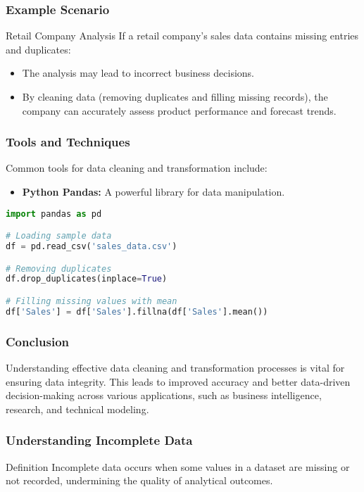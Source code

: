 \documentclass[aspectratio=169]{beamer}
\begin{document}
\begin{frame}[fragile]
    \frametitle{Example Scenario}
    \begin{block}{Retail Company Analysis}
        If a retail company's sales data contains missing entries and duplicates:
        \begin{itemize}
            \item The analysis may lead to incorrect business decisions.
            \item By cleaning data (removing duplicates and filling missing records), the company can accurately assess product performance and forecast trends.
        \end{itemize}
    \end{block}
\end{frame}

\begin{frame}[fragile]
    \frametitle{Tools and Techniques}
    Common tools for data cleaning and transformation include:
    \begin{itemize}
        \item \textbf{Python Pandas:} A powerful library for data manipulation.
    \end{itemize}
    \begin{lstlisting}[language=Python]
import pandas as pd

# Loading sample data
df = pd.read_csv('sales_data.csv')

# Removing duplicates
df.drop_duplicates(inplace=True)

# Filling missing values with mean
df['Sales'] = df['Sales'].fillna(df['Sales'].mean())
    \end{lstlisting}
\end{frame}

\begin{frame}[fragile]
    \frametitle{Conclusion}
    Understanding effective data cleaning and transformation processes is vital for ensuring data integrity. This leads to improved accuracy and better data-driven decision-making across various applications, such as business intelligence, research, and technical modeling.
\end{frame}

\begin{frame}[fragile]
    \frametitle{Understanding Incomplete Data}
    \begin{block}{Definition}
        Incomplete data occurs when some values in a dataset are missing or not recorded, undermining the quality of analytical outcomes.
    \end{block}
\end{frame}
\end{document}
